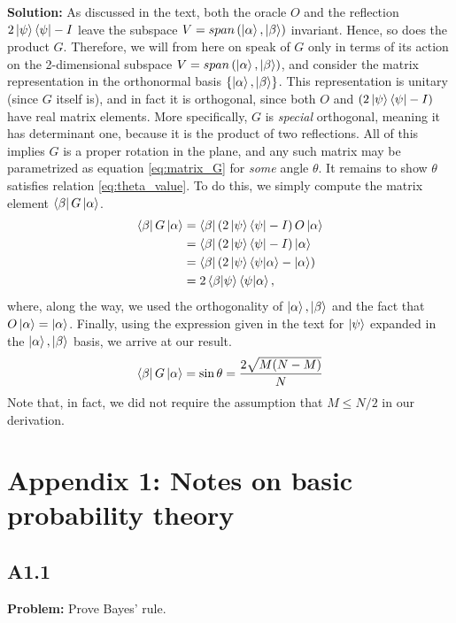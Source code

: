 \documentclass{article}
\begin{document}
\textbf{Solution:} As discussed in the text, both the oracle $O$ and the reflection $2\ket{\psi}\bra{\psi}-I$ leave the subspace $V = span\left(\ket{\alpha},\ket{\beta}\right)$ invariant. Hence, so does the product $G$. Therefore, we will from here on speak of $G$ only in terms of its action on the 2-dimensional subspace $V = span\left(\ket{\alpha},\ket{\beta}\right)$, and consider the matrix representation in the orthonormal basis $\{\ket{\alpha},\ket{\beta}\}$. This representation is unitary (since $G$ itself is), and in fact it is orthogonal, since both $O$ and $(2\ket{\psi}\bra{\psi}-I)$ have real matrix elements. More specifically, $G$ is \emph{special} orthogonal, meaning it has determinant one, because it is the product of two reflections. All of this implies $G$ is a proper rotation in the plane, and any such matrix may be parametrized as equation \eqref{eq:matrix_G} for \emph{some} angle $\theta$. It remains to show $\theta$ satisfies relation \eqref{eq:theta_value}. To do this, we simply compute the matrix element $\bra{\beta}G\ket{\alpha}$.
\begin{align}
\begin{aligned}
    \bra{\beta}G\ket{\alpha} &= \bra{\beta}\left(2\ket{\psi}\bra{\psi}-I\right)O\ket{\alpha} \\
    &=\bra{\beta}\left(2\ket{\psi}\bra{\psi}-I\right)\ket{\alpha}\\
    &=\bra{\beta}\left(2\ket{\psi}\braket{\psi}{\alpha}-\ket{\alpha}\right) \\
    &=2\braket{\beta}{\psi}\braket{\psi}{\alpha},
\end{aligned}
\end{align}
where, along the way, we used the orthogonality of $\ket{\alpha},\ket{\beta}$ and the fact that $O\ket{\alpha} = \ket{\alpha}$. Finally, using the expression given in the text for $\ket{\psi}$ expanded in the $\ket{\alpha},\ket{\beta}$ basis, we arrive at our result. 
\begin{align}
    \bra{\beta}G\ket{\alpha} = \sin\theta = \frac{2\sqrt{M(N-M)}}{N}
\end{align}
Note that, in fact, we did not require the assumption that $M\leq N/2$ in our derivation.

\section*{Appendix 1: Notes on basic probability theory}
\subsection*{A1.1} 
\textbf{Problem:} Prove Bayes' rule.
\end{document}
